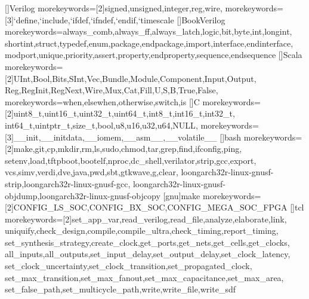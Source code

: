 []{Verilog}{
  morekeywords=[2]{signed,unsigned,integer,reg,wire},
  morekeywords=[3]{`define,`include,`ifdef,`ifndef,`endif,`timescale}
}
[]{BookVerilog}{
  morekeywords={always_comb,always_ff,always_latch,logic,bit,byte,int,longint,
    shortint,struct,typedef,enum,package,endpackage,import,interface,endinterface,
    modport,unique,priority,assert,property,endproperty,sequence,endsequence}
}
[]{Scala}{
  morekeywords=[2]{UInt,Bool,Bits,SInt,Vec,Bundle,Module,Component,Input,Output,
    Reg,RegInit,RegNext,Wire,Mux,Cat,Fill,U,S,B,True,False},
  morekeywords={when,elsewhen,otherwise,switch,is}
}
[]{C}{
  morekeywords=[2]{uint8_t,uint16_t,uint32_t,uint64_t,int8_t,int16_t,int32_t,
    int64_t,uintptr_t,size_t,bool,u8,u16,u32,u64,NULL},
  morekeywords=[3]{__init,__initdata,__iomem,__asm__,__volatile__}
}
[]{bash}{
  morekeywords=[2]{make,git,cp,mkdir,rm,ls,sudo,chmod,tar,grep,find,ifconfig,ping,
    setenv,load,tftpboot,bootelf,nproc,dc_shell,verilator,strip,gcc,export,
    vcs,simv,verdi,dve,java,pwd,sbt,gtkwave,g,clear,
    loongarch32r-linux-gnusf-strip,loongarch32r-linux-gnusf-gcc,
    loongarch32r-linux-gnusf-objdump,loongarch32r-linux-gnusf-objcopy}
}
[gnu]{make}{
  morekeywords=[2]{CONFIG_LS_SOC,CONFIG_BX_SOC,CONFIG_MEGA_SOC_FPGA}
}
[]{tcl}{
  morekeywords=[2]{set_app_var,read_verilog,read_file,analyze,elaborate,link,
    uniquify,check_design,compile,compile_ultra,check_timing,report_timing,
    set_synthesis_strategy,create_clock,get_ports,get_nets,get_cells,get_clocks,
    all_inputs,all_outputs,set_input_delay,set_output_delay,set_clock_latency,
    set_clock_uncertainty,set_clock_transition,set_propagated_clock,
    set_max_transition,set_max_fanout,set_max_capacitance,set_max_area,
    set_false_path,set_multicycle_path,write,write_file,write_sdf}
}
